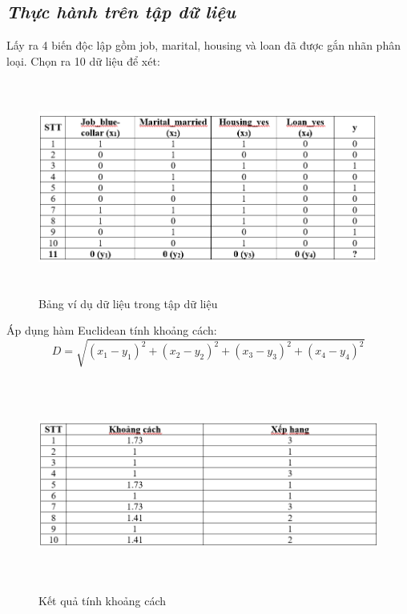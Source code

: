 \documentclass{report}
\begin{document}
\subsection{\textit{Thực hành trên tập dữ liệu}}
    \fontsize{13}{14}\selectfont
    Lấy ra 4 biến độc lập gồm job, marital, housing và loan đã được gắn nhãn phân loại. Chọn ra 10 dữ liệu để xét:
        \begin{center}
        \begin{figure}[htp]
    	\begin{center}
    		\includegraphics[width=15cm, height=7cm]{images/vd_knn.png}
    	\end{center}
    		\caption{Bảng ví dụ dữ liệu trong tập dữ liệu}
    \end{figure}
    \end{center}
    Áp dụng hàm Euclidean tính khoảng cách:
    $$D = \sqrt{(x_1 - y_1)^2 + (x_2 - y_2)^2 + (x_3 - y_3)^2 + (x_4 - y_4)^2}$$
\pagebreak
        \begin{center}
        \begin{figure}[htp]
    	\begin{center}
    		\includegraphics[width=15cm, height=7cm]{images/kq_knn.png}
    	\end{center}
    		\caption{Kết quả tính khoảng cách}
    \end{figure}
    \end{center}
\end{document}
